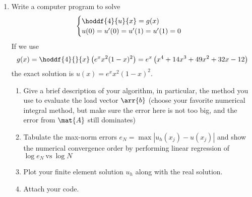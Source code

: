 \documentclass{article}
\begin{document}
\begin{enumerate}
\begin{enumerate}
			\item Write a computer program to solve
				\begin{equation*}
					\begin{cases}
						\displaystyle\hoddf{4}{u}{x} = g(x) \\
						u(0) = u'(0) = u'(1) = u'(1) = 0
					\end{cases}
				\end{equation*}
				If we use
				\begin{equation*}
					g(x) = \hoddf{4}{}{x}\left(e^x x^2(1 - x)^2\right) =
						e^x\left(x^4 + 14x^3 + 49x^2 + 32x - 12\right)
				\end{equation*}
				the exact solution is $u(x) = e^x x^2(1 - x)^2$.
				\begin{enumerate}
					\item Give a brief description of your algorithm, in particular,
						the method you use to evaluate the load vector $\arr{b}$
						(choose your favorite numerical integral method,
						but make sure the error here is not too big,
						and the error from $\mat{A}$ still dominates)
					\item Tabulate the max-norm errors $e_N = \max\left|u_h(x_j) - u(x_j)\right|$
						and show the numerical convergence order by performing linear regression of
						$\log{e_N} \mathrm{\ vs\ } \log{N}$
					\item Plot your finite element solution $u_h$ along with the real solution.
					\item Attach your code.
				\end{enumerate}
		\end{enumerate}
\end{enumerate}
\end{document}
